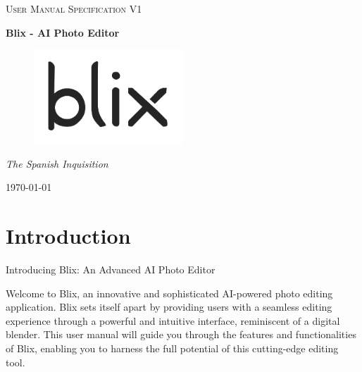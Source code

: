 \documentclass[11pt,a4paper]{article}
\begin{document}
\begin{titlepage}
	\centering
    {\scshape\LARGE User Manual Specification V1\par}
    \vspace{1.5cm}
    {\huge\bfseries Blix - AI Photo Editor\par}
    \vspace{2.5cm}
    \begin{figure}[h]
        \centering %
        \includegraphics[width=0.5\textwidth]{../pics/blix.png}
    \end{figure}
    \vspace{2.5cm}
    {\Large\itshape The Spanish Inquisition\par}

    \vfill
    {\large \today\par}
\end{titlepage}

\tableofcontents
\pagebreak


\section*{Introduction}

Introducing Blix: An Advanced AI Photo Editor

Welcome to Blix, an innovative and sophisticated AI-powered photo editing application. Blix sets itself apart by providing users with a seamless editing experience through a powerful and 
intuitive interface, reminiscent of a digital blender. This user manual will guide you through the features and functionalities of Blix, enabling you to harness the full potential of 
this cutting-edge editing tool.
\end{document}
